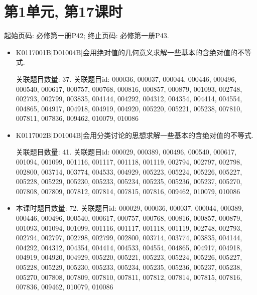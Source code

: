 \section*{第1单元, 第17课时}
起始页码: 必修第一册P42; 终止页码: 必修第一册P43.
\begin{itemize}
\item K0117001B|D01004B|会用绝对值的几何意义求解一些基本的含绝对值的不等式.

关联题目数量: 37. 关联题目id: 000036, 000037, 000044, 000446, 000496, 000540, 000617, 000757, 000768, 000816, 000857, 000879, 001093, 002748, 002793, 002799, 003835, 004144, 004292, 004312, 004354, 004414, 004554, 004865, 004917, 004918, 004919, 004920, 005220, 005221, 005238, 007810, 007811, 007836, 009462, 010079, 010086

\item K0117002B|D01004B|会用分类讨论的思想求解一些基本的含绝对值的不等式.

关联题目数量: 41. 关联题目id: 000029, 000389, 000496, 000540, 000617, 001094, 001099, 001116, 001117, 001118, 001119, 002794, 002797, 002798, 002800, 003714, 003774, 004533, 004929, 005223, 005224, 005226, 005227, 005228, 005229, 005230, 005233, 005234, 005235, 005236, 005237, 005270, 007808, 007809, 007812, 007814, 007815, 007816, 009462, 010079, 010086

\item 本课时题目数量: 72. 关联题目id: 000029, 000036, 000037, 000044, 000389, 000446, 000496, 000540, 000617, 000757, 000768, 000816, 000857, 000879, 001093, 001094, 001099, 001116, 001117, 001118, 001119, 002748, 002793, 002794, 002797, 002798, 002799, 002800, 003714, 003774, 003835, 004144, 004292, 004312, 004354, 004414, 004533, 004554, 004865, 004917, 004918, 004919, 004920, 004929, 005220, 005221, 005223, 005224, 005226, 005227, 005228, 005229, 005230, 005233, 005234, 005235, 005236, 005237, 005238, 005270, 007808, 007809, 007810, 007811, 007812, 007814, 007815, 007816, 007836, 009462, 010079, 010086

\end{itemize}

